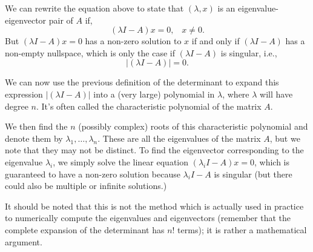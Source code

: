 \documentclass[12pt]{article}
\begin{document}
We can rewrite the equation above to state that $(\lambda, x)$ is an
eigenvalue-eigenvector pair of $A$ if,
\[(\lambda I - A)x = 0, \;\;\; x \neq 0.\]
But $(\lambda I - A)x = 0$ has a non-zero solution to $x$ if and only
if $(\lambda I - A)$ has a non-empty nullspace, which is only the case
if $(\lambda I - A)$ is singular, i.e.,
\[|(\lambda I - A)| = 0.\]


We can now use the previous definition of the determinant to expand
this expression $|(\lambda I - A)|$ into a (very large) polynomial in $\lambda$, where
$\lambda$ will have  degree $n$. It's often called the characteristic polynomial of the matrix $A$. 

We then find the $n$
(possibly complex) roots of this characteristic polynomial and denote them by $\lambda_1, \ldots, \lambda_n$. These are all the eigenvalues of the matrix $A$, but we note that they may not be distinct. 
To find the eigenvector
corresponding to the eigenvalue $\lambda_i$, we simply solve the
linear equation $(\lambda_i I - A)x = 0$, which is guaranteed to have a non-zero solution because $\lambda_i I-A$ is singular (but there could also be multiple or infinite solutions.)




It should be noted that
this is not the method which is actually used in practice to
numerically compute the eigenvalues and eigenvectors (remember that
the complete expansion of the determinant has $n!$ terms); it is
rather a mathematical argument.  
\end{document}
